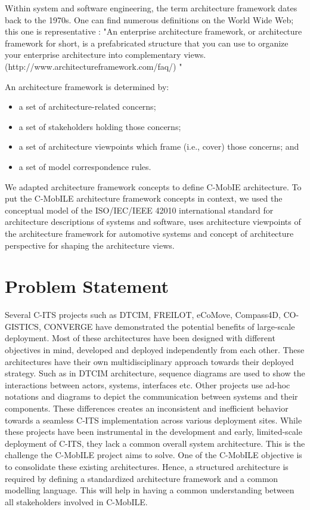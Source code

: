 \documentclass[letterpaper, 10 pt, conference]{ieeeconf}  %
\begin{document}
Within system and software engineering, the term architecture framework dates back to the 1970s. One can find numerous definitions on the World Wide Web; this one is representative \cite{zachman1} :
"An enterprise architecture framework, or architecture framework for short, is a prefabricated structure that you can use to organize your enterprise architecture into complementary views. (http://www.architectureframework.com/faq/) "

An architecture framework is determined by:
\begin{itemize}
	\item a set of architecture-related concerns;
	\item a set of stakeholders holding those concerns;
	\item a set of architecture viewpoints which frame (i.e., cover) those concerns; and
	\item a set of model correspondence rules.
\end{itemize}
We adapted architecture framework concepts to define C-MobIE architecture. To put the C-MobILE architecture framework concepts in context, we used the conceptual model of the ISO/IEC/IEEE 42010 international standard for architecture descriptions of systems and software\cite{arch_framework}, uses architecture viewpoints of the architecture framework for automotive systems\cite{yd} and concept of architecture perspective for shaping the architecture views\cite{woods}.


\section{Problem Statement}

Several C-ITS projects such as DTCIM, FREILOT, eCoMove, Compass4D, CO-GISTICS, CONVERGE have demonstrated the potential benefits of large-scale deployment. Most of these architectures have been designed with different objectives in mind, developed and deployed independently from each other. These architectures have their own multidisciplinary approach towards their deployed strategy. Such as in DTCIM architecture, sequence diagrams are used to show the interactions between actors, systems, interfaces etc. Other projects use ad-hoc notations and diagrams to depict the communication between systems and their components. These differences creates an inconsistent and inefficient behavior towards a seamless C-ITS implementation across various deployment sites. While these projects have been instrumental in the development and early, limited-scale deployment of C-ITS, they lack a common overall system architecture. This is the challenge the C-MobILE project aims to solve. One of the C-MobILE objective is to consolidate these existing architectures. Hence, a structured architecture is required by defining a standardized architecture framework and a common modelling language. This will help in having a common understanding between all stakeholders involved in C-MobILE.
\end{document}
